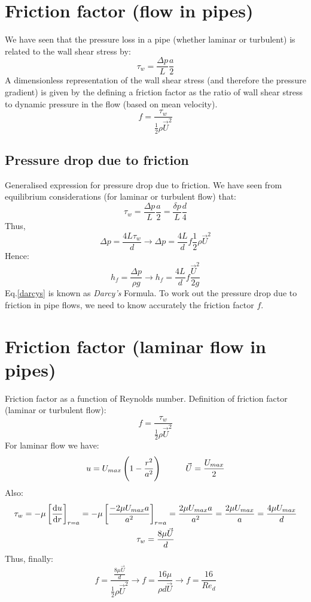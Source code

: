 \documentclass[class=report, crop=false, 12pt,a4paper]{standalone}
\begin{document}
\section{Friction factor (flow in pipes)}
We have seen that the pressure loss in a pipe (whether laminar or turbulent) is related to the wall shear stress by:
\begin{equation}
  \tau_w = \frac{\Delta p}{L}\frac{a}{2}
\end{equation}
A dimensionless representation of the wall shear stress (and therefore the pressure gradient) is given by the defining a friction factor as the ratio of wall shear stress to dynamic pressure in the flow (based on mean velocity).
\begin{equation}
  f = \frac{\tau_w}{\frac{1}{2}\rho \vec{U}^2}
\end{equation}
\subsection{Pressure drop due to friction}
Generalised expression for pressure drop due to friction. We have seen from equilibrium considerations (for laminar or turbulent flow) that: 
\begin{equation}
  \tau_w = \frac{\Delta p}{L} \frac{a}{2} = \frac{\delta p}{L} \frac{d}{4}
\end{equation}
Thus,
\begin{equation}
  \Delta p = \frac{4L\tau_w}{d}\rightarrow \Delta p =\frac{4L}{d} f \frac{1}{2} \rho \vec{U}^2
\end{equation}
Hence:
\begin{equation}
  h_f = \frac{\Delta p}{\rho g} \rightarrow h_f = \frac{4L}{d} f \frac{\vec{U}^2}{2g} \label{darcys}
\end{equation}
Eq.\ref{darcys} is known as \textit{Darcy's} Formula. To work out the pressure drop due to friction in pipe flows, we need to know accurately the friction factor $f$.
\section{Friction factor (laminar flow in pipes)}
Friction factor as a function of Reynolds number. Definition of friction factor (laminar or turbulent flow):
\begin{equation}
  f = \frac{\tau_w}{\frac{1}{2}\rho \vec{U}^2}
\end{equation}
For laminar flow we have:
\begin{equation}
  u = U_{max} \left(1-\frac{r^2}{a^2}\right) \makebox[1cm]{} \vec{U} = \frac{U_{max}}{2}
\end{equation}
Also:
\begin{gather}
  \tau_w = - \mu \left[\frac{\dif u}{\dif r}\right]_{r=a} = -\mu \left[\frac{-2\mu U_{max}a}{a^2}\right]_{r=a} = \frac{2\mu U_{max} a}{a^2} = \frac{2\mu U_{max}}{a} = \frac{4\mu U_{max}}{d}\\
  \tau_w = \frac{8\mu\vec{U}}{d}
\end{gather}
Thus, finally:
\begin{equation}
  f= \frac{\frac{8\mu\vec{U}}{d}}{\frac{1}{2}\rho \vec{U}^2} \rightarrow f = \frac{16\mu}{\rho d \vec{U}} \rightarrow f = \frac{16}{Re_d}
\end{equation}
\end{document}
